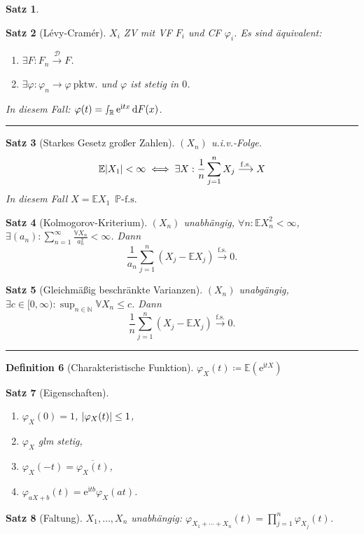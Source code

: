 \documentclass[a4paper,8pt]{article}
\newcounter{Sec}
\theoremstyle{nonumberbreak}
\newtheorem{definition}{Definition}[Sec]
\newtheorem{satz}[definition]{Satz}
\newcommand{\sep}{%
	\rule{\linewidth}{0.15pt}%
	\stepcounter{Sec}%
	}
\newcommand{\defas}{\coloneqq}
\newcommand{\conj}{\overline}
\renewcommand{\P}{\mathbb{P}}
\newcommand{\R}{\mathbb{R}}
\newcommand{\E}{\mathbb{E}}
\newcommand{\V}{\mathbb{V}}
\newcommand{\N}{\mathbb{N}}
\newcommand{\cf}{\varphi}
\newcommand{\e}{\mathrm{e}}
\renewcommand{\i}{\mathrm{i}}
\newcommand{\fsk}{\mathrel{\stackrel{\operatorname{f.s.}}{\longrightarrow}}}
\newcommand{\vk}{\mathrel{\stackrel{\mathcal{D}}{\longrightarrow}}}
\newcommand{\fs}[1]{~\operatorname{#1-f.s.}}
\begin{document}
\begin{multicols}{3}
\begin{satz}
\begin{enumerate}[label=(\alph*)]
		\end{enumerate}
	\end{satz}
	\begin{satz}[Lévy-Cramér]
		$X_i$ ZV mit VF $F_i$ und CF $\cf_i$. Es sind äquivalent:
		\begin{enumerate}[label=(\alph*)]
			\item $\exists F: F_n\vk F$.
			\item $\exists \cf: \cf_n\to\cf~\text{pktw.}$ und $\cf$ ist stetig in $0$.
		\end{enumerate}
		In diesem Fall: $\cf(t)=\smallint_\R\e^{\i tx}\dd{F(x)}$.
	\end{satz}
	\sep
	\begin{satz}[Starkes Gesetz großer Zahlen]
		$(X_n)$ u.i.v.-Folge.
		\[
			\E\abs{X_1}<\infty\iff
			\exists X:\frac{1}{n}\sum_{j=1}^nX_j\fsk X
		\]
		In diesem Fall $X=\E X_1 \fs{\P}$
	\end{satz}
	\begin{satz}[Kolmogorov-Kriterium]
		$(X_n)$ unabhängig, $\forall n:\E X_n^2<\infty$, $\exists (a_n): \sum_{n=1}^\infty \frac{\V X_n}{a_n^2}<\infty$.
		Dann \[\frac{1}{a_n}\sum_{j=1}^n(X_j-\E X_j)\fsk 0.\]
	\end{satz}
	\begin{satz}[Gleichmäßig beschränkte Varianzen]
		$(X_n)$ unabgängig, $\exists c\in[0,\infty):\sup_{n\in\N}\V X_n\leq c$. Dann
		\[\frac{1}{n}\sum_{j=1}^n(X_j-\E X_j)\fsk 0.\]
	\end{satz}
	\sep
	\begin{definition}[Charakteristische Funktion]
		$
			\cf_X(t)\defas \E(\e^{\i tX})
		$
	\end{definition}
	\begin{satz}[Eigenschaften]
		{\setlength{\columnseprule}{0pt}\begin{multicols}{2}
		\begin{enumerate}[label=(\alph*)]
			\item $\cf_X(0)=1$, $\abs{\cf_X(t)}\leq 1$,
			\item $\cf_X$ glm stetig,
			\item $\cf_X(-t) = \conj{\cf_X(t)}$,
			\item $\cf_{aX+b}(t) = \e^{\i tb}\cf_X(at)$.
		\end{enumerate}
		\end{multicols}}
	\end{satz}
	\begin{satz}[Faltung]
		$X_1,\ldots,X_n$ unabhängig: $\cf_{X_1+\cdots+X_n}(t)=\prod_{j=1}^n\cf_{X_j}(t)$.
	\end{satz}

\end{multicols}
\end{document}
